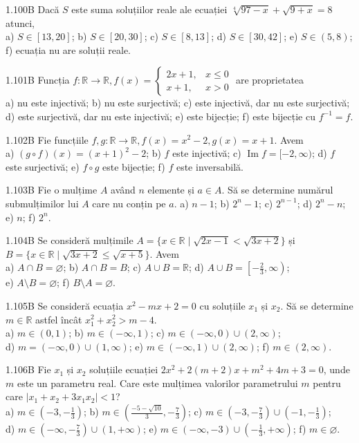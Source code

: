 \documentclass[11pt]{article}
\begin{document}
1.100B Dacă $S$ este suma soluțiilor reale ale ecuației $\sqrt[4]{97-x}+\sqrt{9+x}=8$ atunci,\\ a) $S \in[13,20]$; b) $S \in[20,30]$; c) $S \in[8,13]$; d) $S \in[30,42]$; e) $S \in(5,8)$;\\ f) ecuația nu are soluții reale.

1.101B Funcția $f: \mathbb{R} \rightarrow \mathbb{R}, f(x)=\left\{\begin{array}{ll}2 x+1, & x \leq 0 \\ x+1, & x>0\end{array}\right.$ are proprietatea\\ a) nu este injectivă; b) nu este surjectivă; c) este injectivă, dar nu este surjectivă; d) este surjectivă, dar nu este injectivă; e) este bijecție; f) este bijecție cu $f^{-1}=f$.

1.102B Fie funcțiile $f, g: \mathbb{R} \rightarrow \mathbb{R}, f(x)=x^{2}-2, g(x)=x+1$. Avem\\ a) $(g \circ f)(x)=(x+1)^{2}-2$; b) $f$ este injectivă; c) $\operatorname{Im} f=[-2, \infty)$; d) $f$ este surjectivă; e) $f \circ g$ este bijecție; f) $f$ este inversabilă.

1.103B Fie o mulțime $A$ având $n$ elemente și $a \in A$. Să se determine numărul submulțimilor lui $A$ care nu conțin pe $a$. a) $n-1$; b) $2^{n}-1$; c) $2^{n-1}$; d) $2^{n}-n$; e) $n$; f) $2^{n}$.

1.104B Se consideră mulțimile $A=\{x \in \mathbb{R} \mid \sqrt{2 x-1}<\sqrt{3 x+2}\}$ și $B=\{x \in \mathbb{R} \mid \sqrt{3 x+2} \leq \sqrt{x+5}\}$. Avem\\ a) $A \cap B=\varnothing$; b) $A \cap B=B$; c) $A \cup B=\mathbb{R}$; d) $A \cup B=\left[-\frac{2}{3}, \infty\right)$;\\ e) $A \setminus B=\varnothing$; f) $B \setminus A=\varnothing$.

1.105B Se consideră ecuația $x^{2}-m x+2=0$ cu soluțiile $x_{1}$ și $x_{2}$. Să se determine $m \in \mathbb{R}$ astfel încât $x_{1}^{2}+x_{2}^{2}>m-4$.\\ a) $m \in(0,1)$; b) $m \in(-\infty, 1)$; c) $m \in(-\infty, 0) \cup(2, \infty)$;\\ d) $m=(-\infty, 0) \cup(1, \infty)$; e) $m \in(-\infty, 1) \cup(2, \infty)$; f) $m \in(2, \infty)$.

1.106B Fie $x_{1}$ și $x_{2}$ soluțiile ecuației $2 x^{2}+2(m+2) x+m^{2}+4 m+3=0$, unde $m$ este un parametru real. Care este mulțimea valorilor parametrului $m$ pentru care $\left|x_{1}+x_{2}+3 x_{1} x_{2}\right|<1$?\\ a) $m \in\left(-3,-\frac{1}{3}\right)$; b) $m \in\left(\frac{-5-\sqrt{10}}{3},-\frac{7}{3}\right)$; c) $m \in\left(-3,-\frac{7}{3}\right) \cup\left(-1,-\frac{1}{3}\right)$;\\ d) $m \in\left(-\infty,-\frac{7}{3}\right) \cup(1,+\infty)$; e) $m \in(-\infty,-3) \cup\left(-\frac{1}{3},+\infty\right)$; f) $m \in \varnothing$.
\end{document}
